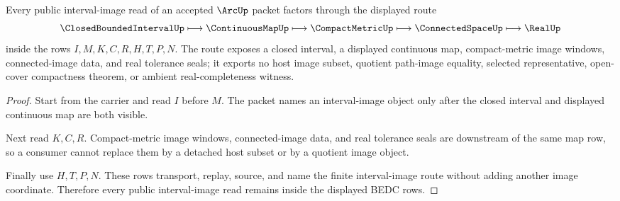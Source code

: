 \begin{theorem}
\label{thm:arc-interval-image-nonescape}
Every public interval-image read of an accepted $\ArcUp$ packet factors through the displayed route
$$
\ClosedBoundedIntervalUp
\longmapsto
\ContinuousMapUp
\longmapsto
\CompactMetricUp
\longmapsto
\ConnectedSpaceUp
\longmapsto
\RealUp
$$
inside the rows $I,M,K,C,R,H,T,P,N$. The route exposes a closed interval, a displayed continuous map, compact-metric image windows, connected-image data, and real tolerance seals; it exports no host image subset, quotient path-image equality, selected representative, open-cover compactness theorem, or ambient real-completeness witness.
\end{theorem}
\begin{proof}
Start from the carrier and read $I$ before $M$. The packet names an interval-image object only after the closed interval and displayed continuous map are both visible.

Next read $K,C,R$. Compact-metric image windows, connected-image data, and real tolerance seals are downstream of the same map row, so a consumer cannot replace them by a detached host subset or by a quotient image object.

Finally use $H,T,P,N$. These rows transport, replay, source, and name the finite interval-image route without adding another image coordinate. Therefore every public interval-image read remains inside the displayed BEDC rows.
\end{proof}




